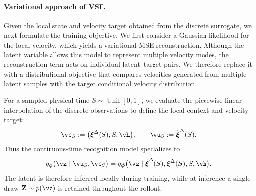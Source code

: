 \paragraph{Variational approach of VSF.} Given the local state and velocity target obtained from the discrete surrogate,
we next formulate the training objective.
We first consider a Gaussian likelihood for the local velocity, which yields a
variational MSE reconstruction. 
Although the latent variable allows this model to
represent multiple velocity modes, the reconstruction term acts on individual
latent--target pairs. We therefore replace it with a distributional objective
that compares velocities generated from multiple latent samples with the
target conditional velocity distribution.





For a sampled physical time $S\sim\operatorname{Unif}[0,1]$, we evaluate
the piecewise-linear interpolation of the discrete observations to define
the local context and velocity target:
\begin{equation}
\vc_S
:=
\bigl(
\boldsymbol{\xi}^{\Delta}(S),
S,
\vh
\bigr),
\qquad
\vu_S
:=
\dot{\boldsymbol{\xi}}^{\Delta}(S).
\label{eq:clean_context_target}
\end{equation}
Thus the continuous-time recognition model specializes to
\begin{equation}
q_{\boldsymbol{\phi}}
\bigl(
\vz
\mid
\vu_S,
\vc_S
\bigr)
=
q_{\boldsymbol{\phi}}
\bigl(
\vz
\mid
\dot{\boldsymbol{\xi}}^{\Delta}(S),
\boldsymbol{\xi}^{\Delta}(S),
S,
\vh
\bigr).
\label{eq:discrete_local_posterior}
\end{equation}
The latent is therefore inferred locally during training, while at inference a
single draw $\mathbf{Z}\sim p(\vz)$ is retained throughout the
rollout.


